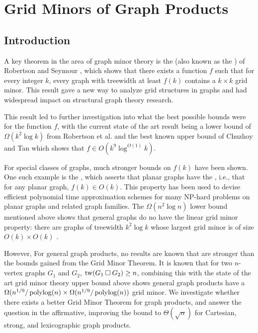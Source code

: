 \documentclass[../main.tex]{subfiles}
\begin{document}
	\section{Grid Minors of Graph Products}
	\subsection{Introduction}
	A key theorem in the area of graph minor theory is the  (also known as the ) of Robertson and Seymour \cite{RS-V}, which shows that there exists a function $f$ such that for every integer $k$, every graph with treewidth at least $f(k)$ contains a $k \times k$ grid minor. This result gave a new way to analyze grid structures in graphs and had widespread impact on structural graph theory research.
	
	This result led to further investigation into what the best possible bounds were for the function $f$, with the current state of the art result being a lower bound of $\Omega(k^2\log k)$ from Robertson et al. \cite{RST-JCTB94} and the best known upper bound of Chuzhoy and Tan which shows that $f \in O(k^9\log^{O(1)}k)$\cite{CT21}.
	
	For special classes of graphs, much stronger bounds on $f(k)$ have been shown. One such example is the , which asserts that planar graphs have the , i.e., that for any planar graph, $f(k) \in O(k)$.  This property has been used to devise efficient polynomial time approximation schemes for many NP-hard problems on planar graphs and related graph families\cite{DHK-Algo09,DFHT-JACM05,DH-Algo04, Eppstein-Algo00, FFLS18}. The $\Omega(n^2\log n)$ lower bound mentioned above shows that general graphs do no have the linear grid minor property: there are graphs of treewidth $k^2\log k$ whose largest grid minor is of size $O(k)\times O(k)$ \cite{RST-JCTB94}.
	
	However, For general graph products, no results are known that are stronger than the bounds gained from the Grid Minor Theorem. It is known that for two $n$-vertex graphs $G_1$ and $G_2$, $\operatorname{tw}(G_1 \mathbin{\Box} G_2) \ge n$\cite{}, combining this with the state of the art grid minor theory upper bound above shows general graph products have a $\Omega(n^{1/9}/\operatorname{polylog}(n) \times \Omega(n^{1/9}/\operatorname{polylog}(n))$ grid minor. We investigate whether there exists a better Grid Minor Theorem for graph products, and answer the question in the affirmative, improving the bound to $\Theta(\sqrt{n})$ for Cartesian, strong, and lexicographic graph products.
	
\end{document}
